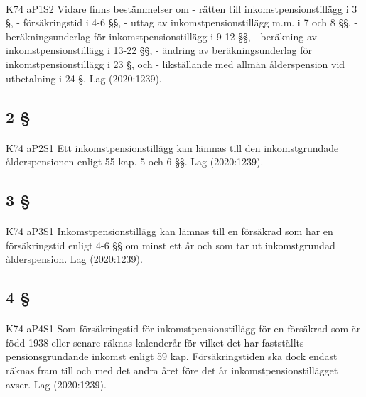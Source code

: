\documentclass[a4paper,notitlepage,openany,10pt]{book}
\begin{document}
\paragraph*{}
{\tiny K74 aP1S2}
Vidare finns bestämmelser om
\newline - rätten till inkomstpensionstillägg i 3 §,
\newline - försäkringstid i 4-6 §§,
\newline - uttag av inkomstpensionstillägg m.m. i 7 och 8 §§,
\newline - beräkningsunderlag för inkomstpensionstillägg i 9-12 §§,
\newline - beräkning av inkomstpensionstillägg i 13-22 §§,
\newline - ändring av beräkningsunderlag för inkomstpensionstillägg i 23 §, och
\newline - likställande med allmän ålderspension vid utbetalning i 24 §.
Lag (2020:1239).
\subsection*{2 §}
\paragraph*{}
{\tiny K74 aP2S1}
Ett inkomstpensionstillägg kan lämnas till den inkomstgrundade ålderspensionen enligt 55 kap. 5 och 6 §§.
Lag (2020:1239).
\subsection*{3 §}
\paragraph*{}
{\tiny K74 aP3S1}
Inkomstpensionstillägg kan lämnas till en försäkrad som har en försäkringstid enligt 4-6 §§ om minst ett år och som tar ut inkomstgrundad ålderspension.
Lag (2020:1239).
\subsection*{4 §}
\paragraph*{}
{\tiny K74 aP4S1}
Som försäkringstid för inkomstpensionstillägg för en försäkrad som är född 1938 eller senare räknas kalenderår för vilket det har fastställts pensionsgrundande inkomst enligt 59 kap. Försäkringstiden ska dock endast räknas fram till och med det andra året före det år inkomstpensionstillägget avser.
Lag (2020:1239).
\end{document}
